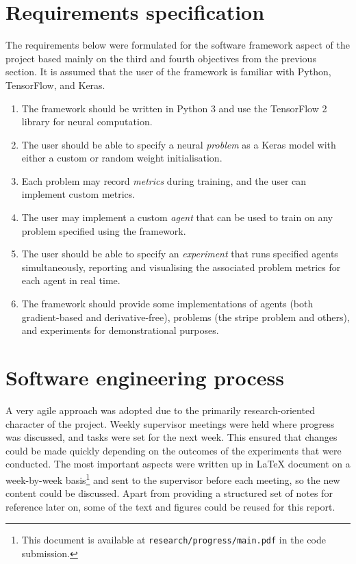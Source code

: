 \section{Requirements specification}
\label{sec:requirements}
The requirements below were formulated for the software framework aspect of the project based mainly on the third and fourth objectives from the previous section.
It is assumed that the user of the framework is familiar with Python, TensorFlow, and Keras.
\begin{enumerate}
    \item The framework should be written in Python 3 and use the TensorFlow 2 library for neural computation.
    \item The user should be able to specify a neural \textit{problem} as a Keras model with either a custom or random weight initialisation.
    \item Each problem may record \textit{metrics} during training, and the user can implement custom metrics.
    \item The user may implement a custom \textit{agent} that can be used to train on any problem specified using the framework.
    \item The user should be able to specify an \textit{experiment} that runs specified agents simultaneously, reporting and visualising the associated problem metrics for each agent in real time. 
    \item The framework should provide some implementations of agents (both gradient-based and derivative-free), problems (the stripe problem and others), and experiments for demonstrational purposes.
\end{enumerate}

\section{Software engineering process}
A very agile approach was adopted due to the primarily research-oriented character of the project.
Weekly supervisor meetings were held where progress was discussed, and tasks were set for the next week.
This ensured that changes could be made quickly depending on the outcomes of the experiments that were conducted.
The most important aspects were written up in \LaTeX{} document on a week-by-week basis\footnote{This document is available at \texttt{research/progress/main.pdf} in the code submission.} and sent to the supervisor before each meeting, so the new content could be discussed.
Apart from providing a structured set of notes for reference later on, some of the text and figures could be reused for this report.

